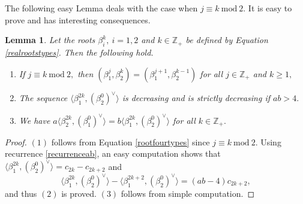 \documentclass[12pt,reqno]{amsart}
\theoremstyle{plain}
\newtheorem{lem}{Lemma}
\theoremstyle{definition}
\theoremstyle{remark}
\newcommand\bz{\mathbb Z}
\begin{document}
The following easy Lemma deals with the case when $j\equiv k\ \mathrm{mod}\ 2.$ It is easy to prove and has interesting consequences.
\begin{lem}\label{lem1congruent}
    Let the roots $\beta_{i}^{k},\ i=1,2$ and $k\in \bz_+$ be defined by Equation \ref{realrootstypes}. Then the following hold.
    \begin{enumerate}
        \item If $j\equiv k\ \mathrm{mod}\ 2,$ then $(\beta_1^j,\beta_2^k)=(\beta_1^{j+1},\beta_2^{k-1})$ for all $j\in \bz_+$ and $k\geq 1,$
        \item The sequence $\langle \beta_1^{2k},(\beta_2^0)^\vee \rangle$ is decreasing and is strictly decreasing if $ab>4.$
        \item We have $a\langle \beta_2^{2k},(\beta_1^0)^\vee \rangle=b\langle \beta_1^{2k},(\beta_2^0)^\vee \rangle$ for all $k\in\bz_+.$
    \end{enumerate}
\end{lem}
\begin{proof}
    $(1)$ follows from Equation \ref{rootfourtypes} since $j\equiv k\ \mathrm{mod}\ 2.$ Using recurrence \ref{recurrenceab}, an easy computation shows that $\langle \beta_1^{2k},(\beta_2^0)^\vee\rangle = c_{2k}-c_{2k+2}$ and 
    $$\langle \beta_1^{2k},(\beta_2^0)^\vee\rangle-\langle \beta_1^{2k+2},(\beta_2^0)^\vee\rangle=(ab-4)c_{2k+2},$$ and thus $(2)$ is proved. $(3)$ follows from simple computation.
\end{proof}
\end{document}
